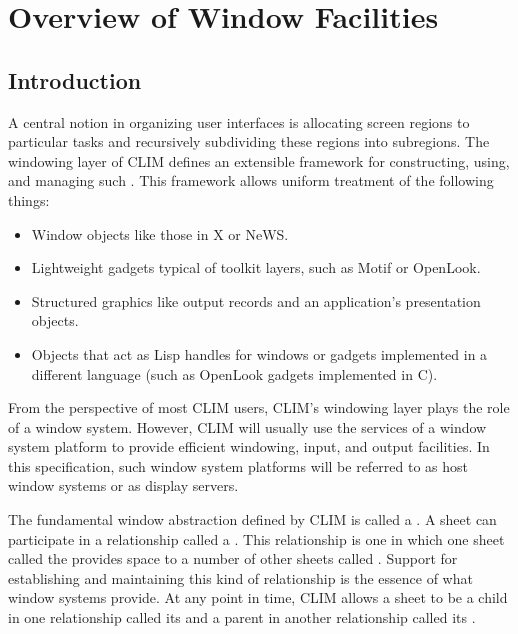 
\chapter {Overview of Window Facilities}

\section {Introduction}

A central notion in organizing user interfaces is allocating screen regions to
particular tasks and recursively subdividing these regions into subregions.  The
windowing layer of CLIM defines an extensible framework for constructing, using,
and managing such .  This framework
allows uniform treatment of the following things:

\begin{itemize}
\item Window objects like those in X or NeWS.

\item Lightweight gadgets typical of toolkit layers, such as Motif or OpenLook.

\item Structured graphics like output records and an application's presentation
objects.

\item Objects that act as Lisp handles for windows or gadgets implemented in a
different language (such as OpenLook gadgets implemented in C).
\end{itemize}

From the perspective of most CLIM users, CLIM's windowing layer plays the role
of a window system.  However, CLIM will usually use the services of a window
system platform to provide efficient windowing, input, and output facilities.
In this specification, such window system platforms will be referred to as host
window systems or as display servers.

The fundamental window abstraction defined by CLIM is called a .
A sheet can participate in a relationship called a .  This relationship is one in which one sheet called the
 provides space to a number of other sheets called
.  Support for establishing and maintaining this kind of
relationship is the essence of what window systems provide.  At any point in
time, CLIM allows a sheet to be a child in one relationship called its
 and a parent in another relationship
called its .

